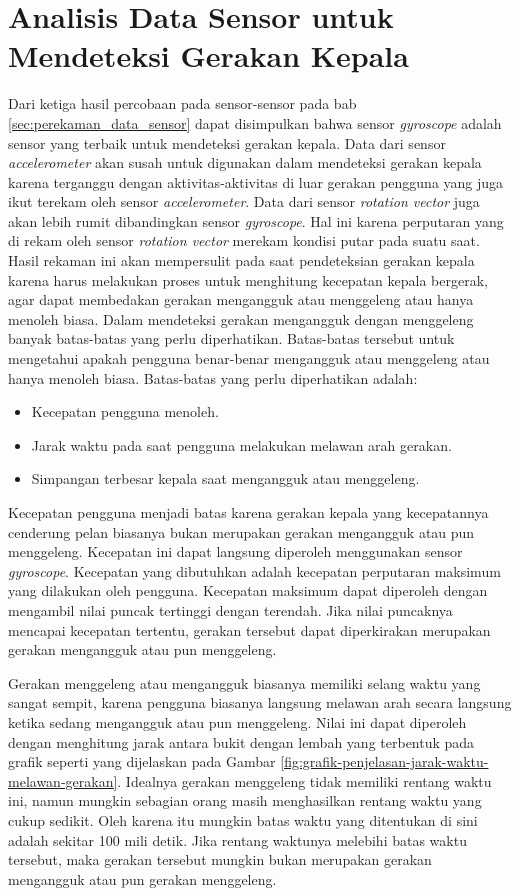 \section{Analisis Data Sensor untuk Mendeteksi Gerakan Kepala}

Dari ketiga hasil percobaan pada sensor-sensor pada bab \ref{sec:perekaman_data_sensor} dapat disimpulkan bahwa sensor \textit{gyroscope} adalah sensor yang terbaik untuk mendeteksi gerakan kepala. Data dari sensor \textit{accelerometer} akan susah untuk digunakan dalam mendeteksi gerakan kepala karena terganggu dengan aktivitas-aktivitas di luar gerakan pengguna yang juga ikut terekam oleh sensor \textit{accelerometer}. Data dari sensor \textit{rotation vector} juga akan lebih rumit dibandingkan sensor \textit{gyroscope}. Hal ini karena perputaran yang di rekam oleh sensor \textit{rotation vector} merekam kondisi putar pada suatu saat. Hasil rekaman ini akan mempersulit pada saat pendeteksian gerakan kepala karena harus melakukan proses untuk menghitung kecepatan kepala bergerak, agar dapat membedakan gerakan mengangguk atau menggeleng atau hanya menoleh biasa. 
Dalam mendeteksi gerakan mengangguk dengan menggeleng banyak batas-batas yang perlu diperhatikan. Batas-batas tersebut untuk mengetahui apakah pengguna benar-benar mengangguk atau menggeleng atau hanya menoleh biasa. Batas-batas yang perlu diperhatikan adalah:

\begin{itemize}
	\item Kecepatan pengguna menoleh.
	\item Jarak waktu pada saat pengguna melakukan melawan arah gerakan.
	\item Simpangan terbesar kepala saat mengangguk atau menggeleng.
\end{itemize}

Kecepatan pengguna menjadi batas karena gerakan kepala yang kecepatannya cenderung pelan biasanya bukan merupakan gerakan mengangguk atau pun menggeleng. Kecepatan ini dapat langsung diperoleh menggunakan sensor \textit{gyroscope}. Kecepatan yang dibutuhkan adalah kecepatan perputaran maksimum yang dilakukan oleh pengguna. Kecepatan maksimum dapat diperoleh dengan mengambil nilai puncak tertinggi dengan terendah. Jika nilai puncaknya mencapai kecepatan tertentu, gerakan tersebut dapat diperkirakan merupakan gerakan mengangguk atau pun menggeleng.

Gerakan menggeleng atau mengangguk biasanya memiliki selang waktu yang sangat sempit, karena pengguna biasanya langsung melawan arah secara langsung ketika sedang mengangguk atau pun menggeleng. Nilai ini dapat diperoleh dengan menghitung jarak antara bukit dengan lembah yang terbentuk pada grafik seperti yang dijelaskan pada Gambar \ref{fig:grafik-penjelasan-jarak-waktu-melawan-gerakan}. Idealnya gerakan menggeleng tidak memiliki rentang waktu ini, namun mungkin sebagian orang masih menghasilkan rentang waktu yang cukup sedikit. Oleh karena itu mungkin batas waktu yang ditentukan di sini adalah sekitar 100 mili detik. Jika rentang waktunya melebihi batas waktu tersebut, maka gerakan tersebut mungkin bukan merupakan gerakan mengangguk atau pun gerakan menggeleng. 

